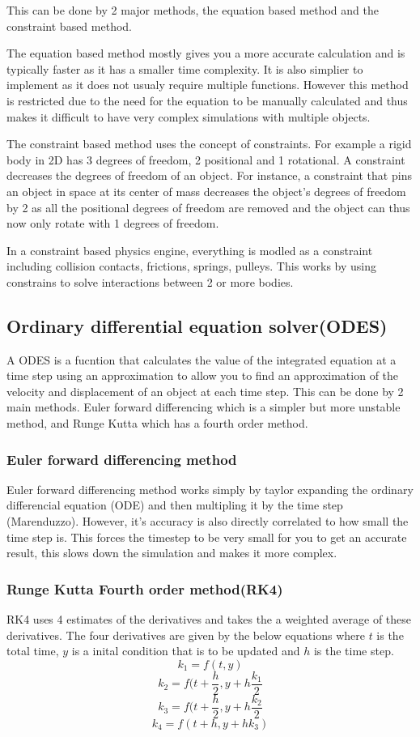\documentclass[12pt, a2paper]{article}
\begin{document}
This can be done by 2 major methods, the equation based method and the constraint based method.

The equation based method mostly gives you a more accurate calculation and is typically faster as it has a smaller time complexity. It is also simplier to implement as it does not usualy require multiple functions. However this method is restricted due to the need for the equation to be manually calculated and thus makes it difficult to have very complex simulations with multiple objects.

The constraint based method uses the concept of constraints. For example a rigid body in 2D has 3 degrees of freedom, 2 positional and 1 rotational. A constraint decreases the degrees of freedom of an object. For instance, a constraint that pins an object in space at its center of mass decreases the object’s degrees of freedom by 2 as all the positional degrees of freedom are removed and the object can thus now only rotate with 1 degrees of freedom.

In a constraint based physics engine, everything is modled as a constraint including collision contacts, frictions, springs, pulleys. This works by using constrains to solve interactions between 2 or more bodies.

\subsection{Ordinary differential equation solver(ODES)}
A ODES is a fucntion that calculates the value of the integrated equation at a time step using an approximation to allow you to find an approximation of the velocity and displacement of an object at each time step. This can be done by 2 main methods. Euler forward differencing which is a simpler but more unstable method, and Runge Kutta which has a fourth order method. 

\subsubsection{Euler forward differencing method}
Euler forward differencing method works simply by taylor expanding the ordinary differencial equation (ODE) and then multipling it by the time step (Marenduzzo). However, it's accuracy is also directly correlated to how small the time step is. This forces the timestep to be very small for you to get an accurate result, this slows down the simulation and makes it more complex. 

\subsubsection{Runge Kutta Fourth order method(RK4)}
RK4 uses 4 estimates of the derivatives and takes the a weighted average of these derivatives. The four derivatives are given by the below equations where \(t\) is the total time, \(y\) is a inital condition that is to be updated and \(h\) is the time step. 
\[k_{1} = f(t,y)\]
\[k_{2} = f(t+\frac{h}{2},y+h\frac{k_{1}}{2}\]
\[k_{3} = f(t+\frac{h}{2},y+h\frac{k_{2}}{2}\]
\[k_{4} = f(t+h,y+hk_{3})\]
\end{document}
